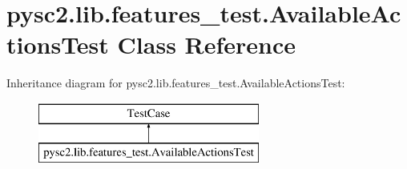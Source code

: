 \hypertarget{classpysc2_1_1lib_1_1features__test_1_1_available_actions_test}{}\section{pysc2.\+lib.\+features\+\_\+test.\+Available\+Actions\+Test Class Reference}
\label{classpysc2_1_1lib_1_1features__test_1_1_available_actions_test}
Inheritance diagram for pysc2.\+lib.\+features\+\_\+test.\+Available\+Actions\+Test\+:\begin{figure}[H]
\begin{center}
\leavevmode
\includegraphics[height=2.000000cm]{classpysc2_1_1lib_1_1features__test_1_1_available_actions_test}
\end{center}
\end{figure}
